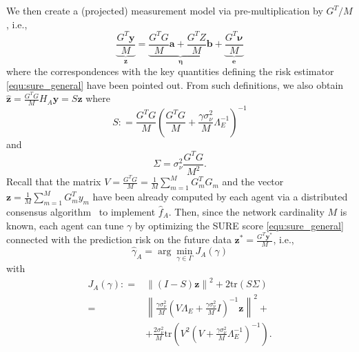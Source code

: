 \documentclass[10pt,twocolumn,twoside]{IEEEtran}					%
\theoremstyle	{plain}
\newcommand{\TraceOf}				[1]	{\mathrm{tr} \left( #1 \right)}
\newcommand{\DefinedAs}			[0]	{\mathrel{\mathop:}=}
\begin{document}
We then create a (projected) measurement model via pre-multiplication by $G^{T}/M$, i.e.,
\begin{equation}
	\underbrace{\frac{G^{T} \bm{y}}{M}}_{\bm{z}} 
	=
	\underbrace{\frac{G^{T} G}{M} \bm{a}
	+
	\frac{G^{T} Z}{M} \bm{b}}_{\bm{\eta}}
	+
	\underbrace{\frac{G^{T} \bm{\nu}}{M}}_{\bm{e}}
	\label{equ:measurement_model_alternative_compact_SURE} 
\end{equation}
where the correspondences with the key quantities defining the risk estimator \eqref{equ:sure_general} have been pointed out. From such definitions, we also obtain $\widehat{\bm{z}} = \frac{G^{T} G}{M} H_{A} \bm{y} = S \bm{z}$ where 
\begin{equation}
	S
	\DefinedAs
	\frac{G^{T} G}{M} \left( \frac{G^{T} G}{M} + \frac{\gamma \sigma^{2}_{\nu}}{ M} \Lambda^{-1}_{E} \right)^{-1} 
	\label{equ:S_for_distributed_SURE}
\end{equation}
and
\begin{equation}
	\Sigma = \sigma^{2}_{\nu} \frac{G^{T} G}{M^{2}}. 
	\label{equ:Sigma_for_distributed_SURE}
\end{equation}
%
Recall that the matrix $V=\frac{G^{T} G}{M}=\frac{1}{M}\sum_{m=1}^M G_m^T G_m$ and the vector $\bm{z} = \frac{1}{M}\sum_{m=1}^M G_m^T y_m$ have been already computed by each agent via a distributed consensus algorithm~\cite{garin2010survey} to implement $\widehat{f}_{A}$. 
Then, since the network cardinality $M$ is known, each agent can tune $\gamma$ by optimizing the \ac{SURE} score \eqref{equ:sure_general} connected with the prediction risk on the future data $\bm{z}^{\ast} =\frac{G^{T} \bm{y}^{\ast}}{M}$, i.e.,
%
\begin{equation}
	\widehat \gamma_A
	=
	\arg \min_{\gamma\in \Gamma} J_{A} \left( \gamma \right)
	\label{equ:SURE_A}
\end{equation}
%
with
%
\begin{equation}
	\begin{array}{rl}
	J_{A} \left( \gamma \right)
	\DefinedAs &
	 \left\| (I-S) \bm{z} \right\|^2 + 2 \TraceOf{S \Sigma}\\
	= &
	\displaystyle
	\left\|
		\frac{\gamma \sigma^{2}_{\nu}}{M}
		\left( V\Lambda_{E} + \frac{\gamma \sigma^{2}_{\nu}}{ M} I \right)^{-1} \bm{z}
	\right\|^2 + \\
	&
	\displaystyle
	+ \frac{2 \sigma^{2}_{\nu}}{M} \TraceOf{V^2 \left( V + \frac{\gamma \sigma^{2}_{\nu}}{ M} \Lambda^{-1}_{E} \right)^{-1}}. \\
	\label{equ:definition-of-J-A}
	\end{array}
\end{equation}
%
\end{document}

